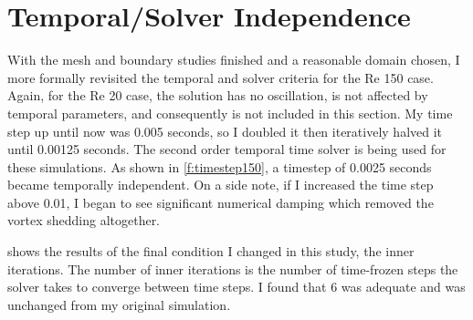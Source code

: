 \documentclass[10pt,english]{article}
\begin{document}
\section{Temporal/Solver Independence}

With the mesh and boundary studies finished and a reasonable domain chosen, I more formally revisited the temporal and solver criteria for the Re 150 case.  Again, for the Re 20 case, the solution has no oscillation, is not affected by temporal parameters, and consequently is not included in this section.  My time step up until now was 0.005 seconds, so I doubled it then iteratively halved it until 0.00125 seconds.  The second order temporal time solver is being used for these simulations.  As shown in \cref{f:timestep150}, a timestep of 0.0025 seconds became temporally independent.  On a side note, if I increased the time step above 0.01, I began to see significant numerical damping which removed the vortex shedding altogether.  

 shows the results of the final condition I changed in this study, the inner iterations.  The number of inner iterations is the number of time-frozen steps the solver takes to converge between time steps.  I found that 6 was adequate and was unchanged from my original simulation.  
\end{document}
